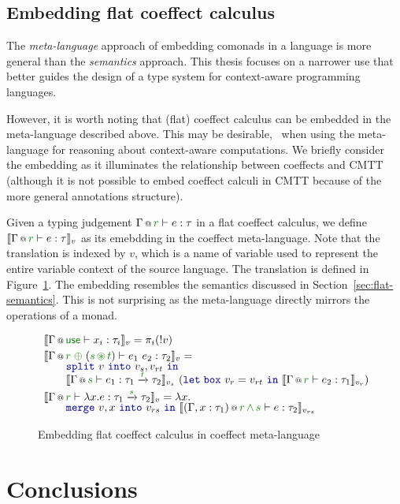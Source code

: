 
\subsection{Embedding flat coeffect calculus}

The \emph{meta-language} approach of embedding comonads in a language is more general than the
\emph{semantics} approach. This thesis focuses on a narrower use that better guides the design of
a type system for context-aware programming languages. 

However, it is worth noting that 
(flat) coeffect calculus can be embedded in the meta-language described above. This may be 
desirable, \eg~when using the meta-language for reasoning about context-aware computations. 
We briefly consider the embedding as it illuminates the relationship between coeffects and
CMTT (although it is not possible to embed coeffect calculi in CMTT because of the more general
annotations structure).

Given a typing judgement $\coctx{\Gamma}{\cclrd{r}} \vdash e : \tau$ in a flat coeffect calculus,
we define $\sem{\coctx{\Gamma}{\cclrd{r}} \vdash e : \tau}_v$ as its emebdding in the coeffect
meta-language. Note that the translation is indexed by $v$, which is a name of variable used 
to represent the entire variable context of the source language. The translation is defined in
Figure~\ref{fig:conclusions-embed}. The embedding resembles the semantics discussed in 
Section~\ref{sec:flat-semantics}. This is not surprising as the meta-language directly mirrors
the operations of a monad.


\begin{figure}[t]
\begin{equation*}
\begin{array}{l}
 \sem{ \coctx{\Gamma}{\cunit}\vdash x_i : \tau_i }_v = \pi_i (!v) \\[0.25em]
 \sem{ \coctx{\Gamma}{\cclrd{r}\;\cpar\;(\cclrd{s}\,\cseq\,\cclrd{t})} \vdash e_1~e_2 : \tau_2 }_v =\\[-0.25em]
   \qquad \kvd{split}~v~\kvd{into}~v_s, v_{rt}~\kvd{in} \\[-0.25em]
   \qquad \sem{ \coctx{\Gamma}{\cclrd{s}} \vdash e_1 : \tau_1 \xrightarrow{\cclrd{t}} \tau_2 }_{v_s}
      ~(\kvd{let\;box}~v_r = v_{rt}~\kvd{in}~\sem{ \coctx{\Gamma}{\cclrd{r}} \vdash e_2 : \tau_1}_{v_r}) \\[0.25em]
 \sem{ \coctx{\Gamma}{\cclrd{r}} \vdash \lambda x.e:\tau_1 \xrightarrow{\cclrd{s}} \tau_2 }_v = \lambda x. \\[-0.25em]
   \qquad \kvd{merge}~v,x~\kvd{into}~v_{rs}~\kvd{in}~\sem{ \coctx{(\Gamma,x:\tau_1)}{\cclrd{r}\,\czip\,\cclrd{s}} \vdash e : \tau_2 }_{v_{rs}}
\end{array}
\end{equation*}
\caption{Embedding flat coeffect calculus in coeffect meta-language }
\label{fig:conclusions-embed}
\end{figure}


\section{Conclusions}
